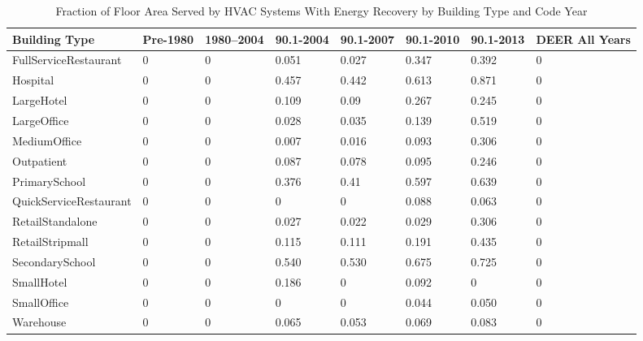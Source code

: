 \begin{table}[h!]
\centering
\scriptsize
\caption[Energy Recovery Prevalence]{Fraction of Floor Area Served by HVAC Systems With Energy Recovery by Building Type and Code Year}
\label{tab:energy_recovery_prev}
\begin{tabular}{|p{2.2cm}|p{0.3in}|p{0.3in}|p{0.3in}|p{0.3in}|p{0.3in}|p{0.3in}|p{0.3in}|}
\hline
\textbf{Building Type} &
  \textbf{Pre-1980} &
  \textbf{1980--2004} &
  \textbf{90.1-2004} &
  \textbf{90.1-2007} &
  \textbf{90.1-2010} &
  \textbf{90.1-2013} &
  \textbf{DEER All Years} \\ \hline
FullService\-Restaurant  & 0 & 0 & 0.051 & 0.027 & 0.347 & 0.392 & 0 \\ \hline
Hospital               & 0 & 0 & 0.457 & 0.442 & 0.613 & 0.871 & 0 \\ \hline
LargeHotel             & 0 & 0 & 0.109 & 0.09  & 0.267 & 0.245 & 0 \\ \hline
LargeOffice            & 0 & 0 & 0.028 & 0.035 & 0.139 & 0.519 & 0 \\ \hline
MediumOffice           & 0 & 0 & 0.007 & 0.016 & 0.093 & 0.306 & 0 \\ \hline
Outpatient             & 0 & 0 & 0.087 & 0.078 & 0.095 & 0.246 & 0 \\ \hline
PrimarySchool          & 0 & 0 & 0.376 & 0.41  & 0.597 & 0.639 & 0 \\ \hline
QuickService\-Restaurant & 0 & 0 & 0     & 0     & 0.088 & 0.063 & 0 \\ \hline
RetailStandalone       & 0 & 0 & 0.027 & 0.022 & 0.029 & 0.306 & 0 \\ \hline
RetailStripmall        & 0 & 0 & 0.115 & 0.111 & 0.191 & 0.435 & 0 \\ \hline
SecondarySchool        & 0 & 0 & 0.540 & 0.530 & 0.675 & 0.725 & 0 \\ \hline
SmallHotel             & 0 & 0 & 0.186 & 0     & 0.092 & 0     & 0 \\ \hline
SmallOffice            & 0 & 0 & 0     & 0     & 0.044 & 0.050 & 0 \\ \hline
Warehouse              & 0 & 0 & 0.065 & 0.053 & 0.069 & 0.083 & 0 \\ \hline
\end{tabular}
\end{table}